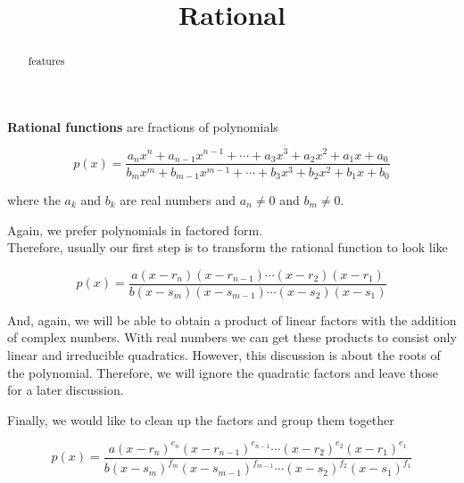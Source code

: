\documentclass{ximera}
\title{Rational}
\begin{document}
\begin{abstract}
features
\end{abstract}
\maketitle








\begin{definition}

\textbf{Rational functions} are fractions of polynomials




\[ p(x) =   \frac{ a_n x^n + a_{n-1} x^{n-1} + \cdots + a_3 x^3 + a_2 x^2 + a_1 x + a_0  } { b_m x^m + b_{m-1} x^{m-1} + \cdots + b_3 x^3 + b_2 x^2 + b_1 x + b_0 }   \]



where the $a_k$ and $b_k$ are real numbers and $a_n \ne 0$ and $b_m \ne 0$.


\end{definition}





Again, we prefer polynomials in factored form.  \\


Therefore, usually our first step is to transform the rational function to look like



\[ p(x) =   \frac{ a (x-r_n)(x-r_{n-1})  \cdots (x-r_2)(x-r_1)  } { b (x-s_m)(x-s_{m-1})  \cdots (x-s_2)(x-s_1) }   \]




And, again, we will be able to obtain a product of linear factors with the addition of complex numbers.  With real numbers we can get these products to consist only linear and irreducible quadratics. However, this discussion is about the roots of the polynomial.  Therefore, we will ignore the quadratic factors and leave those for a later discussion.




Finally, we would like to clean up the factors and group them together






\[ p(x) =   \frac{ a (x-r_n)^{e_n} (x-r_{n-1})^{e_{n-1}}  \cdots (x-r_2)^{e_2} (x-r_1)^{e_1}  } { b (x-s_m)^{f_m} (x-s_{m-1})^{f_{m-1}}  \cdots (x-s_2)^{f_2} (x-s_1)^{f_1} }   \]
\end{document}
